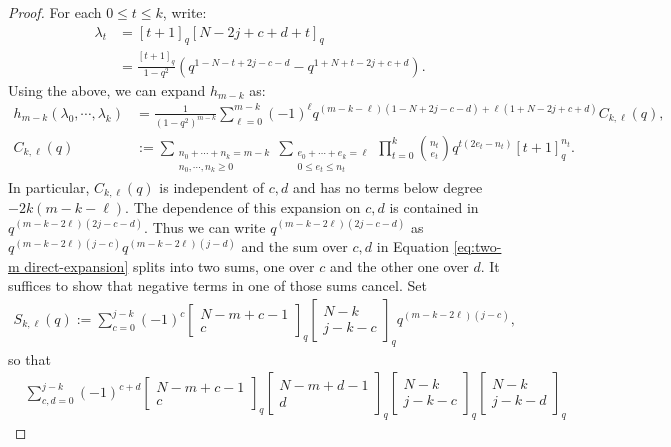 \documentclass[12pt]{amsart}
\theoremstyle{definition}
\theoremstyle{remark}
\numberwithin{equation}{section}
\numberwithin{figure}{section}
\begin{document}
\begin{proof}
For each $0 \leq t \leq k$, write:
\begin{align*}
    \lambda_t &= [t+1]_q[N-2j+c+d+t]_q 
    \\
    &= \frac{[t+1]_q}{1-q^2}\left(q^{1-N-t+2j-c-d} - q^{1+N+t-2j+c+d}\right).
\end{align*}
Using the above, we can expand $h_{m-k}$ as:
\begin{align*}
    h_{m-k}(\lambda_0,\cdots,\lambda_k)
    &= \frac{1}{(1-q^2)^{m-k}}\sum_{\ell = 0}^{m-k} (-1)^\ell
     q^{(m-k-\ell)(1-N+2j-c-d)+\ell(1+N-2j+c+d)} C_{k,\ell}(q), \\
    C_{k,\ell}(q) &:= \sum_{\substack{n_0+\cdots+n_k=m-k\\n_0,\cdots,n_k\geq0}} \sum_{\substack{e_0+\cdots+e_k=\ell\\0\leq e_t\leq n_t}} \prod_{t=0}^k \binom{n_t}{e_t} q^{t(2e_t-n_t)}[t+1]_q^{n_t}.
\end{align*}
In particular, $C_{k,\ell}(q)$ is independent of $c,d$ and has no terms below degree $-2k(m-k-\ell)$. The dependence of this expansion on $c,d$ is contained in $q^{(m-k-2\ell)(2j-c-d)}$. Thus we can write $q^{(m-k-2\ell)(2j-c-d)}$ as $q^{(m-k-2\ell)(j-c)}q^{(m-k-2\ell)(j-d)}$ and the sum over $c,d$ in Equation \eqref{eq:two-m direct-expansion} splits into two sums, one over $c$ and the other one over $d$. It suffices to show that negative terms in one of those sums cancel. Set
\begin{align*}
    S_{k,\ell}(q) := \sum_{c = 0}^{j-k} (-1)^c
    \begin{bmatrix}N-m+c-1\\c\end{bmatrix}_q
    \begin{bmatrix}N-k\\j-k-c\end{bmatrix}_q q^{(m-k-2\ell)(j-c)},
\end{align*}
so that 
\begin{align*}
&\sum_{c,d=0}^{j-k}(-1)^{c+d}
\begin{bmatrix}N-m+c-1\\c\end{bmatrix}_q
\begin{bmatrix}N-m+d-1\\d\end{bmatrix}_q
\begin{bmatrix}N-k\\j-k-c\end{bmatrix}_q
\begin{bmatrix}N-k\\j-k-d\end{bmatrix}_q

\end{align*}
\end{proof}
\end{document}
